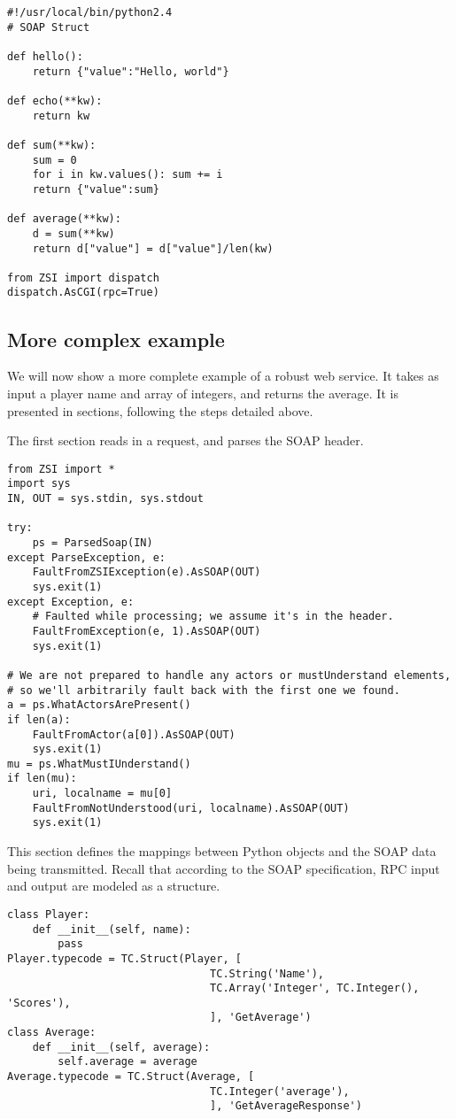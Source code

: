 \begin{verbatim}
#!/usr/local/bin/python2.4
# SOAP Struct

def hello():
    return {"value":"Hello, world"}

def echo(**kw):
    return kw

def sum(**kw):
    sum = 0
    for i in kw.values(): sum += i
	return {"value":sum}

def average(**kw):
	d = sum(**kw)
    return d["value"] = d["value"]/len(kw)

from ZSI import dispatch
dispatch.AsCGI(rpc=True)
\end{verbatim}



\subsection{More complex example}

We will now show a more complete example of a robust web service.
It takes as input a player name and array of integers, and returns
the average.
It is presented in sections, following the steps detailed above.

The first section reads in a request, and parses the SOAP header.

\begin{verbatim}
from ZSI import *
import sys
IN, OUT = sys.stdin, sys.stdout

try:
    ps = ParsedSoap(IN)
except ParseException, e:
    FaultFromZSIException(e).AsSOAP(OUT)
    sys.exit(1)
except Exception, e:
    # Faulted while processing; we assume it's in the header.
    FaultFromException(e, 1).AsSOAP(OUT)
    sys.exit(1)

# We are not prepared to handle any actors or mustUnderstand elements,
# so we'll arbitrarily fault back with the first one we found.
a = ps.WhatActorsArePresent()
if len(a):
    FaultFromActor(a[0]).AsSOAP(OUT)
    sys.exit(1)
mu = ps.WhatMustIUnderstand()
if len(mu):
    uri, localname = mu[0]
    FaultFromNotUnderstood(uri, localname).AsSOAP(OUT)
    sys.exit(1)
\end{verbatim}

This section defines the mappings between Python objects and the SOAP
data being transmitted.
Recall that according to the SOAP specification, RPC input and output
are modeled as a structure.

\begin{verbatim}
class Player:
    def __init__(self, name):
        pass
Player.typecode = TC.Struct(Player, [
                                TC.String('Name'),
                                TC.Array('Integer', TC.Integer(), 'Scores'),
                                ], 'GetAverage')
class Average:
    def __init__(self, average):
        self.average = average
Average.typecode = TC.Struct(Average, [
                                TC.Integer('average'),
                                ], 'GetAverageResponse')
\end{verbatim}


